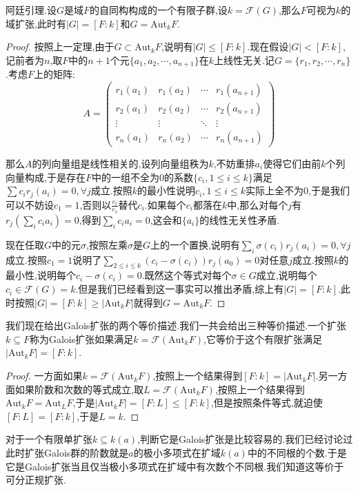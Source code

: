 阿廷引理.设$G$是域$F$的自同构构成的一个有限子群,设$k=\mathscr{F}(G)$,那么$F$可视为$k$的域扩张,此时有$|G|=[F:k]$和$G=\mathrm{Aut}_kF$.
\begin{proof}
		
按照上一定理,由于$G\subset\mathrm{Aut}_kF$,说明有$|G|\le[F:k]$.现在假设$|G|<[F:k]$,记前者为$n$,取$F$中的$n+1$个元$\{a_1,a_2,\cdots,a_{n+1}\}$在$k$上线性无关.记$G=\{r_1,r_2,\cdots,r_n\}$.考虑$F$上的矩阵:
$$A=\left(\begin{array}{cccc}
r_1(a_1)&r_1(a_2)&\cdots&r_1(a_{n+1})\\
r_2(a_1)&r_2(a_2)&\cdots&r_2(a_{n+1})\\
\vdots&\vdots&\ddots&\vdots\\
r_n(a_1)&r_n(a_2)&\cdots&r_n(a_{n+1})
\end{array}\right)$$
		
那么$A$的列向量组是线性相关的,设列向量组秩为$k$,不妨重排$a_i$使得它们由前$k$个列向量构成,于是存在$F$中的一组不全为0的系数$\{c_i,1\le i\le k\}$满足$\sum c_ir_j(a_i)=0,\forall j$成立.按照$k$的最小性说明$c_i,1\le i\le k$实际上全不为0,于是我们可以不妨设$c_1=1$,否则以$\frac{c_i}{c_1}$替代$c_i$.如果每个$c_i$都落在$k$中,那么对每个$j$有$r_j(\sum_ic_ia_i)=0$,得到$\sum_ic_ia_i=0$,这会和$\{a_i\}$的线性无关性矛盾.
		
现在任取$G$中的元$\sigma$,按照左乘$\sigma$是$G$上的一个置换,说明有$\sum_i\sigma(c_i)r_j(a_i)=0,\forall j$成立.按照$c_1=1$说明了$\sum_{2\le i\le k}(c_i-\sigma(c_i))r_j(a_0)=0$对任意$j$成立.按照$k$的最小性,说明每个$c_i-\sigma(c_i)=0$.既然这个等式对每个$\sigma\in G$成立,说明每个$c_i\in\mathscr{F}(G)=k$.但是我们已经看到这一事实可以推出矛盾,综上有$|G|=[F:k]$.此时按照$|G|=[F:k]\ge|\mathrm{Aut}_kF|$就得到$G=\mathrm{Aut}_kF$.
\end{proof}

我们现在给出Galois扩张的两个等价描述.我们一共会给出三种等价描述.一个扩张$k\subseteq F$称为Galois扩张如果满足$k=\mathscr{F}(\mathrm{Aut}_kF)$,它等价于这个有限扩张满足$|\mathrm{Aut}_kF|=[F:k]$.
\begin{proof}
	
	一方面如果$k=\mathscr{F}(\mathrm{Aut}_kF)$,按照上一个结果得到$[F:k]=|\mathrm{Aut}_kF|$.另一方面如果阶数和次数的等式成立,取$L=\mathscr{F}(\mathrm{Aut}_kF)$,按照上一个结果得到$\mathrm{Aut}_kF=\mathrm{Aut}_LF$,于是$|\mathrm{Aut}_kF|=[F:L]\le[F:k]$,但是按照条件等式,就迫使$[F:L]=[F:k]$,于是$L=k$.
\end{proof}

对于一个有限单扩张$k\subseteq k(a)$,判断它是Galois扩张是比较容易的.我们已经讨论过此时扩张Galois群的阶数就是$a$的极小多项式在扩域$k(a)$中的不同根的个数.于是它是Galois扩张当且仅当极小多项式在扩域中有次数个不同根.我们知道这等价于可分正规扩张.

